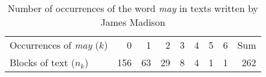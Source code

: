 \begin{table}[htb]
\centering
\caption{Number of occurrences of the word \emph{may} in texts written by James Madison\label{tab:fedtab}} 
\begin{tabular}{l|rrrrrrrr}
   \hline
Occurrences of \emph{may} ($k$) & 0 & 1 & 2 & 3 & 4 & 5 & 6 & Sum \\ 
  Blocks of text ($n_k$)       & 156 &  63 &  29 &   8 &   4 &   1 &   1 & 262 \\ 
   \hline
\end{tabular}
\end{table}
